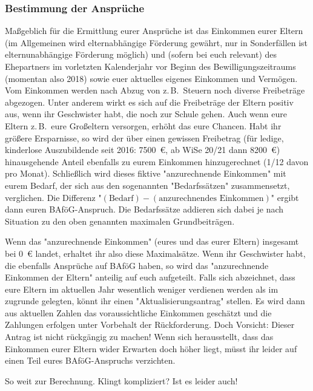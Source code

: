 \begin{multicols*}{2}
\subsubsection{Bestimmung der Ansprüche}
Maßgeblich für die Ermittlung eurer Ansprüche ist das Einkommen eurer Eltern (im Allgemeinen wird elternabhängige Förderung gewährt, nur in Sonderfällen ist elternunabhängige Förderung möglich) und (sofern bei euch relevant) des Ehepartners im vorletzten Kalenderjahr vor Beginn des Bewilligungszeitraums (momentan also 2018) sowie euer aktuelles eigenes Einkommen und Vermögen.
Vom Einkommen werden nach Abzug von z.\,B.\ Steuern noch diverse Freibeträge abgezogen.
Unter anderem wirkt es sich auf die Freibeträge der Eltern positiv aus, wenn ihr Geschwister habt, die noch zur Schule gehen.
Auch wenn eure Eltern z.\,B.\ eure Großeltern versorgen, erhöht das eure Chancen.
Habt ihr größere Ersparnisse, so wird der über einen gewissen Freibetrag (für ledige, kinderlose Auszubildende seit 2016: \SI{7500}{\euro}, ab WiSe 20/21 dann \SI{8200}{\euro}) hinausgehende Anteil ebenfalls zu eurem Einkommen hinzugerechnet (\num{1/12} davon pro Monat).
Schließlich wird dieses fiktive "anzurechnende Einkommen" mit eurem Bedarf, der sich aus den sogenannten "Bedarfssätzen" zusammensetzt, verglichen.
Die Differenz "$(\text{Bedarf}) - (\text{anzurechnendes Einkommen})$" ergibt dann euren BAföG-Anspruch.
Die Bedarfssätze addieren sich dabei je nach Situation zu den oben genannten maximalen Grundbeiträgen.

Wenn das "anzurechnende Einkommen" (eures und das eurer Eltern) insgesamt bei \SI{0}{\euro} landet, erhaltet ihr also diese Maximalsätze.
Wenn ihr Geschwister habt, die ebenfalls Ansprüche auf BAföG haben, so wird das "anzurechnende Einkommen der Eltern" anteilig auf euch aufgeteilt.
Falls sich abzeichnet, dass eure Eltern im aktuellen Jahr wesentlich weniger verdienen werden als im zugrunde gelegten, könnt ihr einen "Aktualisierungsantrag" stellen.
Es wird dann aus aktuellen Zahlen das voraussichtliche Einkommen geschätzt und die Zahlungen erfolgen unter Vorbehalt der Rückforderung.
Doch Vorsicht: Dieser Antrag ist nicht rückgängig zu machen! Wenn sich herausstellt, dass das Einkommen eurer Eltern wider Erwarten doch höher liegt, müsst ihr leider auf einen Teil eures BAföG-Anspruchs verzichten.

So weit zur Berechnung.
Klingt kompliziert? Ist es leider auch!


\end{multicols*}

